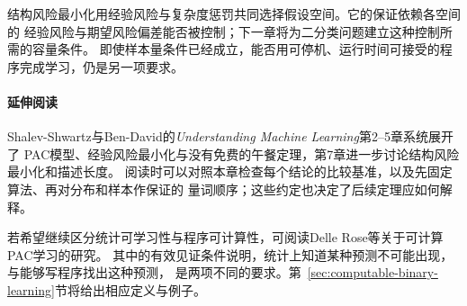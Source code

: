 结构风险最小化用经验风险与复杂度惩罚共同选择假设空间。它的保证依赖各空间的
经验风险与期望风险偏差能否被控制；下一章将为二分类问题建立这种控制所需的容量条件。
即使样本量条件已经成立，能否用可停机、运行时间可接受的程序完成学习，仍是另一项要求。

\paragraph{延伸阅读}
Shalev-Shwartz与Ben-David的\textit{Understanding Machine Learning}第2--5章系统展开了
PAC模型、经验风险最小化与没有免费的午餐定理，第7章进一步讨论结构风险最小化和描述长度。
阅读时可以对照本章检查每个结论的比较基准，以及先固定算法、再对分布和样本作保证的
量词顺序；这些约定也决定了后续定理应如何解释。

若希望继续区分统计可学习性与程序可计算性，可阅读Delle Rose等关于可计算PAC学习的研究。
其中的有效见证条件说明，统计上知道某种预测不可能出现，与能够写程序找出这种预测，
是两项不同的要求。第~\ref{sec:computable-binary-learning}节将给出相应定义与例子。
